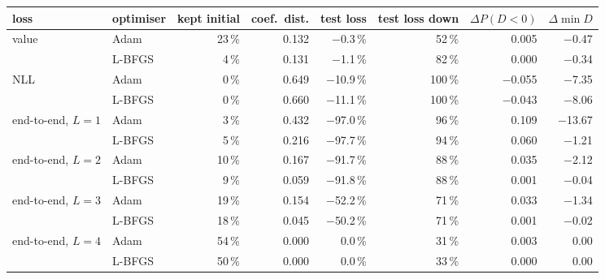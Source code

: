 \footnotesize
\begin{tabular}{llrrrrrr}
\toprule
loss & optimiser & kept initial & coef.\ dist. & test loss & test loss down & $\Delta P(D<0)$ & $\Delta\min D$ \\
\midrule
value & Adam & 23\,\% & 0.132 & $-$0.3\,\% & 52\,\% & 0.005 & $-$0.47 \\
 & L-BFGS & 4\,\% & 0.131 & $-$1.1\,\% & 82\,\% & 0.000 & $-$0.34 \\
NLL & Adam & 0\,\% & 0.649 & $-$10.9\,\% & 100\,\% & $-$0.055 & $-$7.35 \\
 & L-BFGS & 0\,\% & 0.660 & $-$11.1\,\% & 100\,\% & $-$0.043 & $-$8.06 \\
end-to-end, $L=1$ & Adam & 3\,\% & 0.432 & $-$97.0\,\% & 96\,\% & 0.109 & $-$13.67 \\
 & L-BFGS & 5\,\% & 0.216 & $-$97.7\,\% & 94\,\% & 0.060 & $-$1.21 \\
end-to-end, $L=2$ & Adam & 10\,\% & 0.167 & $-$91.7\,\% & 88\,\% & 0.035 & $-$2.12 \\
 & L-BFGS & 9\,\% & 0.059 & $-$91.8\,\% & 88\,\% & 0.001 & $-$0.04 \\
end-to-end, $L=3$ & Adam & 19\,\% & 0.154 & $-$52.2\,\% & 71\,\% & 0.033 & $-$1.34 \\
 & L-BFGS & 18\,\% & 0.045 & $-$50.2\,\% & 71\,\% & 0.001 & $-$0.02 \\
end-to-end, $L=4$ & Adam & 54\,\% & 0.000 & 0.0\,\% & 31\,\% & 0.003 & 0.00 \\
 & L-BFGS & 50\,\% & 0.000 & 0.0\,\% & 33\,\% & 0.000 & 0.00 \\
\bottomrule
\end{tabular}
